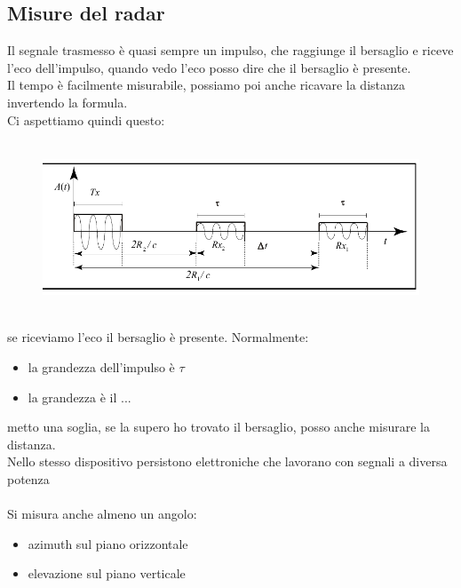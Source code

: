 \documentclass[oneside, 12pt]{extbook}
\begin{document}
\subsection{Misure del radar}
Il segnale trasmesso è quasi sempre un impulso, che raggiunge il bersaglio e riceve l'eco dell'impulso, quando vedo l'eco posso dire che il bersaglio è presente.\\
Il tempo è facilmente misurabile, possiamo poi anche ricavare la distanza invertendo la formula.\\
Ci aspettiamo quindi questo:\\\\
\begin{figure}[!h]
	\includegraphics[scale=0.4]{immagini/localization/radar_mes.png}
\end{figure}\\
se riceviamo l'eco il bersaglio è presente. Normalmente:
\begin{itemize}
	\item la grandezza dell'impulso è $\tau$
	\item la grandezza è il ...
\end{itemize}
metto una soglia, se la supero ho trovato il bersaglio, posso anche misurare la distanza.\\
Nello stesso dispositivo persistono elettroniche che lavorano con segnali a diversa potenza\\\\
Si misura anche almeno un angolo:
\begin{itemize}
	\item azimuth sul piano orizzontale
	\item elevazione sul piano verticale
\end{itemize}
\end{document}
